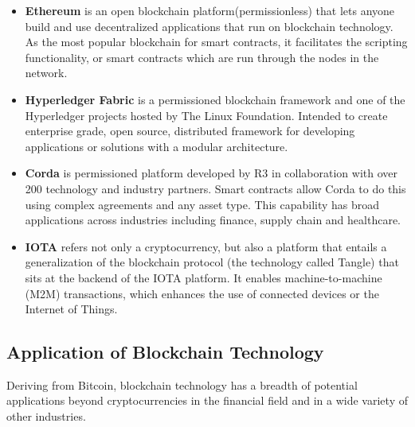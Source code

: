 \begin{itemize}
	\item \textbf{Ethereum} is an open blockchain platform(permissionless) that lets anyone build and use decentralized applications that run on blockchain technology.\cite{EthereumWhitePaper}  As the most popular blockchain for smart contracts, it facilitates the scripting functionality, or smart contracts which are run through the nodes in the network.
	\item  \textbf{Hyperledger Fabric} is a permissioned blockchain framework and one of the Hyperledger projects hosted by The Linux Foundation. Intended to create enterprise grade, open source, distributed framework for developing applications or solutions with a modular architecture. 
	\item  \textbf{Corda} is permissioned platform developed by R3 in collaboration with over 200 technology and industry partners. Smart contracts allow Corda to do this using complex agreements and any asset type. This capability has broad applications across industries including finance, supply chain and healthcare. 
	\item \textbf{IOTA} refers not only a cryptocurrency, but also a platform that entails a generalization of the blockchain protocol (the technology called Tangle) that sits at the backend of the IOTA platform. It enables machine-to-machine (M2M) transactions, which enhances the use of connected devices or the Internet of Things.
\end{itemize}

\subsection{Application of Blockchain Technology}
Deriving from Bitcoin, blockchain technology has a breadth of potential applications beyond cryptocurrencies in the financial field and in a wide variety of other industries.

